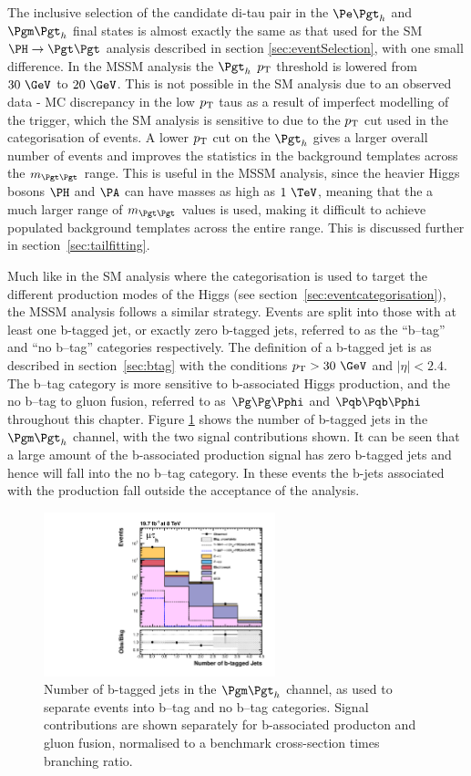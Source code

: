 The inclusive selection of the candidate di-tau pair in the $\etau$ and $\mutau$
final states is almost exactly the same
as that used for the \ac{SM} $\HToTauTau$ analysis described in section
\ref{sec:eventSelection}, with one small difference. In the \ac{MSSM} analysis
the $\Pgth$ $p_{\mathrm{T}}$ threshold is lowered from $30~\GeV$ to $20~\GeV$. This is
not possible in the \ac{SM} analysis due to an observed data - \ac{MC}
discrepancy in the low $p_{\mathrm{T}}$ taus as a result of imperfect modelling of the
trigger, which the \ac{SM} analysis is sensitive to due to the $p_{\mathrm{T}}$ cut used in the
categorisation of events. A lower $p_{\mathrm{T}}$ cut on the $\Pgth$ gives a larger overall number of events
and improves the statistics in the background templates across the
$m_{\Pgt\Pgt}$ range. This is useful in the \ac{MSSM} analysis, since the 
heavier Higgs bosons $\PH$ and $\PA$ can have masses as high as $1~\TeV$,
meaning that the a much larger range of $m_{\Pgt\Pgt}$ values is used, making it
difficult to achieve populated background templates across the entire range.
This is discussed further in section~\ref{sec:tailfitting}.

Much like in the \ac{SM} analysis where the categorisation is used to target the different 
production modes of the Higgs (see section~\ref{sec:eventcategorisation}), 
the \ac{MSSM} analysis follows a similar
strategy. Events are split into those with at least one b-tagged jet, or exactly
zero b-tagged jets, referred to as the ``b--tag'' and ``no b--tag'' categories
respectively. The definition of a b-tagged jet is as described in
section~\ref{sec:btag} with the conditions
$\pt > 30~\GeV$ and $|\eta| < 2.4$. The b--tag
category is more sensitive to b-associated Higgs production, and the no b--tag
to gluon fusion, referred to as $\Pg\Pg\Pphi$ and $\Pqb\Pqb\Pphi$ throughout
this chapter. Figure \ref{fig:nbtag} shows the number of b-tagged jets in the
$\mutau$ channel, with the two signal contributions shown. It can be seen
that a large amount of the b-associated production signal has zero b-tagged jets
and hence will fall into the no b--tag category. In these events the b-jets
associated with the production fall outside the acceptance of the analysis.

\begin{figure}[tbh]
\includegraphics[width=0.6\textwidth]{plots/htt-mssm/n_bjets_inclusive_mt_2012_log.pdf}

\caption{Number of b-tagged jets in the $\mutau$ channel, as used to separate
events into b--tag and no b--tag categories. Signal contributions are shown
separately for b-associated producton and gluon fusion, normalised to a
benchmark cross-section times branching ratio.}
\label{fig:nbtag}
\end{figure}

